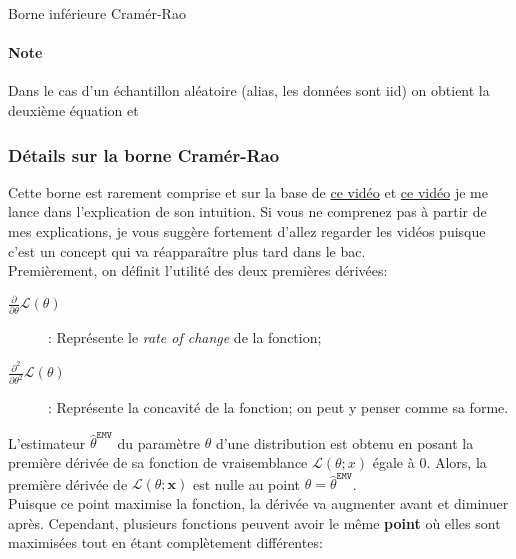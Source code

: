 \documentclass[10pt, french]{article}
\begin{document}
\begin{multicols*}{2}
\begin{algo}{\hypertarget{cramer-rao}{Borne inférieure Cramér-Rao}}
\paragraph{Note}	Dans le cas d'un échantillon aléatoire (alias, les données sont iid) on obtient la deuxième équation et 
\end{algo}

\subsubsection*{Détails sur la borne Cramér-Rao}
Cette borne est rarement comprise et sur la base de \hyperlink{https://www.youtube.com/watch?v=igQIsYAlKlY}{\color{blue}ce vidéo} et \hyperlink{https://www.youtube.com/watch?v=i0JiSddCXMM}{\color{blue}ce vidéo} je me lance dans l'explication de son intuition. Si vous ne comprenez pas à partir de mes explications, je vous suggère fortement d'allez regarder les vidéos puisque c'est un concept qui va réapparaître plus tard dans le bac.\\

Premièrement, on définit l'utilité des deux premières dérivées:
\begin{description}
	\item[$\frac{\partial}{\partial\theta} \mathcal{L}(\theta)$]: Représente le \og \textit{rate of change}\fg{} de la fonction;
	\item[$\frac{\partial^{2}}{\partial\theta^{2}} \mathcal{L}(\theta)$]: Représente la concavité de la fonction; on peut y penser comme sa forme.
\end{description}

L'estimateur $\hat\theta^{\texttt{EMV}}$ du paramètre $\theta$ d'une distribution est obtenu en posant la première dérivée de sa fonction de vraisemblance $\mathcal{L}(\theta ; x)$ égale à 0. Alors, la première dérivée de $\mathcal{L}(\theta; \bm{x})$ est nulle au point $\theta = \hat\theta^{\texttt{EMV}}$. \\

Puisque ce point maximise la fonction, la dérivée va augmenter avant et diminuer après.
Cependant, plusieurs fonctions peuvent avoir le même \textbf{point} où elles sont maximisées tout en étant complètement différentes:


\end{multicols*}
\end{document}
